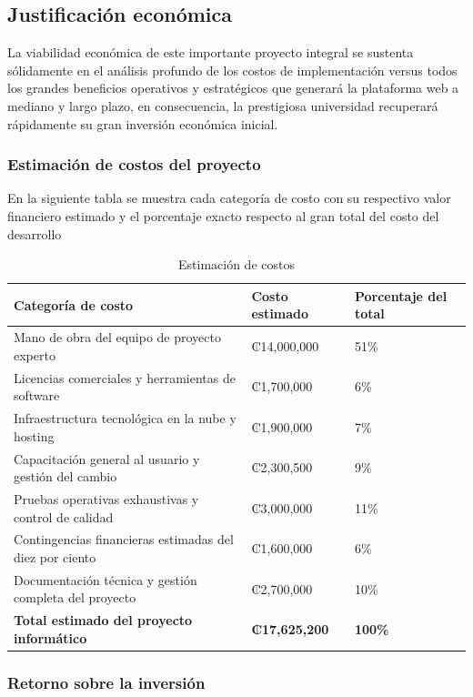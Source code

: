 \documentclass[11pt,spanish]{article}
\begin{document}
\subsection{Justificación económica}

La viabilidad económica de este importante proyecto integral se sustenta sólidamente en el análisis profundo de los costos de implementación versus todos los grandes beneficios operativos y estratégicos que generará la plataforma web a mediano y largo plazo, en consecuencia, la prestigiosa universidad recuperará rápidamente su gran inversión económica inicial.

\subsubsection{Estimación de costos del proyecto}

En la siguiente tabla se muestra cada categoría de costo con su respectivo valor financiero estimado y el porcentaje exacto respecto al gran total del costo del desarrollo

\begin{table}[H]
\centering
\small
\caption{Estimación de costos}\label{tab:costos}
\begin{tabularx}{\textwidth}{Y R{4.1cm} R{3.2cm}}
\toprule
\textbf{Categoría de costo} & \textbf{Costo estimado} & \textbf{Porcentaje del total} \\
\midrule
Mano de obra del equipo de proyecto experto & ₡14,000,000 & 51\% \\
Licencias comerciales y herramientas de software & ₡1,700,000 & 6\% \\
Infraestructura tecnológica en la nube y hosting & ₡1,900,000 & 7\% \\
Capacitación general al usuario y gestión del cambio & ₡2,300,500 & 9\% \\
Pruebas operativas exhaustivas y control de calidad & ₡3,000,000 & 11\% \\
Contingencias financieras estimadas del diez por ciento & ₡1,600,000 & 6\% \\
Documentación técnica y gestión completa del proyecto & ₡2,700,000 & 10\% \\
\midrule
\textbf{Total estimado del proyecto informático} & \textbf{₡17,625,200} & \textbf{100\%} \\
\bottomrule
\end{tabularx}
\end{table}

\subsubsection{Retorno sobre la inversión}
\end{document}
